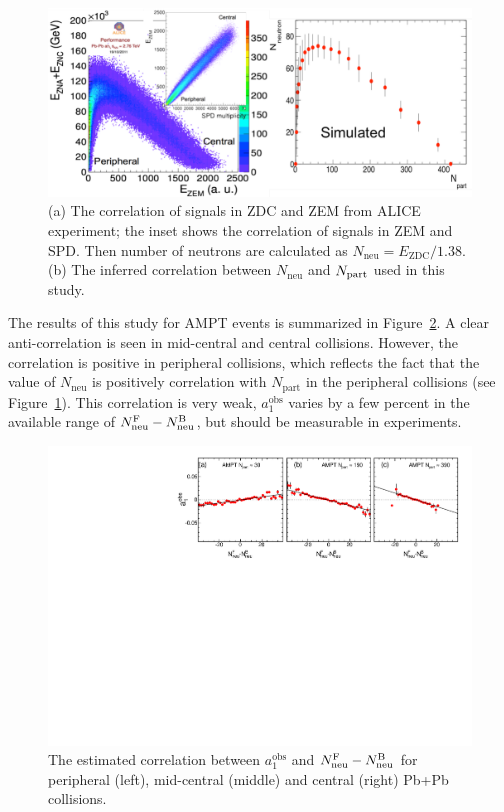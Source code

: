 \begin{figure}[H]
\centering
\includegraphics[width=.95\linewidth]{figs/chapter_fbcorr/Model_ALICE_neutron.pdf}
\caption{(a) The correlation of signals in ZDC and ZEM from ALICE experiment; the inset shows the correlation of signals in ZEM and SPD. Then number of neutrons are calculated as $N_\text{neu} = E_\text{ZDC} / 1.38$. (b) The inferred correlation between $N_\text{neu}$ and $N_\text{part}$ used in this study.}
\label{fig:fbcorr_Model_ALICE_neutron}
\end{figure}

The results of this study for AMPT events is summarized in Figure~\ref{fig:fbcorr_Model_neutron_fit}. A clear anti-correlation is seen in mid-central and central collisions. However, the correlation is positive in peripheral collisions, which reflects the fact that the value of $N_\text{neu}$ is positively correlation with $N_\text{part}$ in the peripheral collisions (see Figure~\ref{fig:fbcorr_Model_ALICE_neutron}). This correlation is very weak, $a_1^\text{obs}$ varies by a few percent in the available range of $N_\text{neu}^\text{F} - N_\text{neu}^\text{B}$, but should be measurable in experiments.

\begin{figure}[H]
\centering
\includegraphics[width=.95\linewidth]{figs/chapter_fbcorr/Model_neutron_fit.pdf}
\caption{The estimated correlation between $a_1^\text{obs}$ and $N_\text{neu}^\text{F} - N_\text{neu}^\text{B}$ for peripheral (left), mid-central (middle) and central (right) Pb+Pb collisions.}
\label{fig:fbcorr_Model_neutron_fit}
\end{figure}



